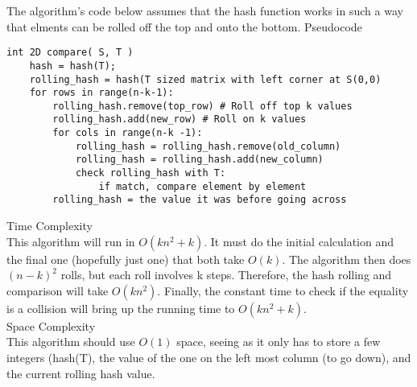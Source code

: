 \documentclass[12pt,twoside]{article}
\begin{document}
\begin{problems}
\begin{problemparts}
The algorithm's code below assumes that the hash function works in such a way that elments can be rolled off the top and onto the bottom.
\problempart Pseudocode\\
\begin{lstlisting}
int 2D compare( S, T )
	hash = hash(T);
	rolling_hash = hash(T sized matrix with left corner at S(0,0)
	for rows in range(n-k-1):
		rolling_hash.remove(top_row) # Roll off top k values
		rolling_hash.add(new_row) # Roll on k values
		for cols in range(n-k -1):
			rolling_hash = rolling_hash.remove(old_column)
			rolling_hash = rolling_hash.add(new_column)
			check rolling_hash with T:
				if match, compare element by element
		rolling_hash = the value it was before going across
\end{lstlisting}

\problempart Time Complexity \\
This algorithm will run in $O(kn^2 + k)$.  It must do the initial calculation and the final one (hopefully just one) that both take $O(k)$.  The algorithm then does $(n-k)^2$ rolls, but each roll involves k steps.  Therefore, the hash rolling and comparison will take $O(kn^2)$.  Finally, the constant time to check if the equality is a collision will bring up the running time to $O(kn^2 + k)$.\\

\problempart Space Complexity \\
This algorithm should use $O(1)$ space, seeing as it only has to store a few integers (hash(T), the value of the one on the left most column (to go down), and the current rolling hash value.
\end{problemparts}
\end{problems}
\end{document}

